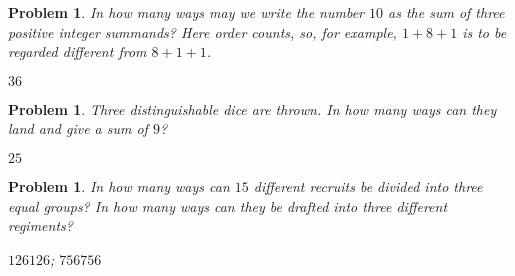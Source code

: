 \documentclass[11pt, openany]{book}
\theoremstyle{change} \theoremheaderfont{\blue\sffamily\bfseries}
\newtheorem{pro}[thm]{Problem}
\theoremstyle{nonumberplain} \theoremheaderfont{\sffamily\bfseries}
\newcommand{\í}{\'{\i}}
\begin{document}
\begin{multicols}{2}
     \begin{pro}\label{pro:summingto10}
In how many ways may we write the number $10$ as the sum of three
positive integer summands? Here order counts, so, for example, $1 +
8 + 1$ is to be regarded different from $8 + 1 + 1$.
\begin{answer}$36$
\end{answer}
  \end{pro}
     \begin{pro}
Three distinguishable dice are thrown. In how many ways can they
land and give a sum of $9$?
\begin{answer}$25$
\end{answer}
 \end{pro}
  \begin{pro}
In how many ways can $15$ different recruits be divided into three
equal groups? In how many ways can they be drafted into three
different regiments?
\begin{answer}$126126$; $756756$
\end{answer}
\end{pro}
\end{multicols}
\end{document}
